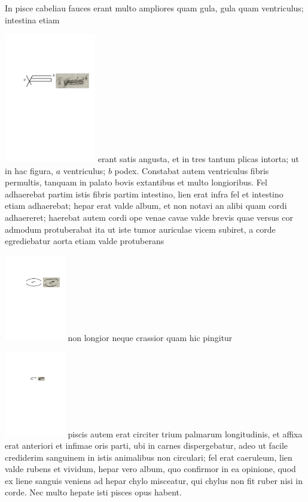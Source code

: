 \pend%
\pstart%
In pisce cabeliau fauces erant multo ampliores quam gula, gula quam ventriculus; intestina etiam
\rule[-2mm]{0mm}{13mm}\includegraphics[width=0.3\textwidth]{images/lh0040104b_011v1.pdf}
erant satis angusta, et in tres tantum plicas intorta; ut in hac figura, $a$ ventriculus; $b$ podex. Constabat autem ventriculus fibris permultis, tanquam in palato bovis extantibus et multo longioribus. Fel adhaerebat partim istis fibris partim intestino, lien erat infra fel et intestino etiam adhaerebat; hepar erat valde album, et non notavi an alibi quam cordi adhaereret; haerebat autem cordi ope venae cavae valde brevis quae versus cor admodum protuberabat ita ut iste tumor auriculae vicem subiret, a corde egrediebatur aorta etiam valde protuberans
\rule[-2mm]{0mm}{11mm}\includegraphics[width=0.2\textwidth]{images/lh0040104b_011v2.pdf}
non longior neque crassior quam hic pingitur
\rule[-2mm]{0mm}{10mm}\includegraphics[width=0.2\textwidth]{images/lh0040104b_011v3.pdf}
piscis autem erat circiter trium palmarum longitudinis, et affixa erat anteriori et infimae oris parti, ubi in carnes dispergebatur, adeo ut facile crediderim sanguinem in istis animalibus non circulari; fel erat caeruleum, lien valde rubens et vividum, hepar vero album, quo confirmor in ea opinione, quod ex liene sanguis veniens ad hepar chylo misceatur, qui chylus non fit ruber nisi in corde. Nec multo hepate isti pisces opus habent.
